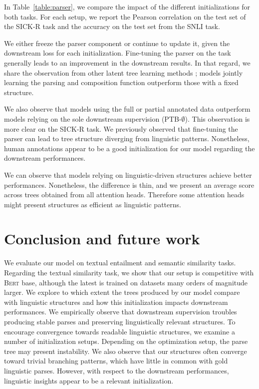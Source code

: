 In Table~\ref{table:parser}, we compare the impact of the different initializations for both tasks. For each setup, we report the Pearson correlation on the test set of the SICK-R task and the accuracy on the test set from the SNLI task.

We either freeze the parser component or continue to update it, given the downstream loss for each initialization. Fine-tuning the parser on the task generally leads to an improvement in the downstream results. In that regard, we share the observation from other latent tree learning methods \parencite{maillard_19, choi_18}; models jointly learning the parsing and composition function outperform those with a fixed structure. 

We also observe that models using the full or partial annotated data outperform models relying on the sole downstream supervision (PTB-$\emptyset$). This observation is more clear on the SICK-R task. We previously observed that fine-tuning the parser can lead to tree structure diverging from linguistic patterns. Nonetheless, human annotations appear to be a good initialization for our model regarding the downstream performances. 

We can observe that models relying on linguistic-driven structures achieve better performances. Nonetheless, the difference is thin, and we present an average score across trees obtained from all attention heads. Therefore some attention heads might present structures as efficient as linguistic patterns.

\section{Conclusion and future work}

We evaluate our model on textual entailment and semantic similarity tasks. Regarding the textual similarity task, we show that our setup is competitive with \textsc{Bert} base, although the latest is trained on datasets many orders of magnitude larger. We explore to which extent the trees produced by our model compare with linguistic structures and how this initialization impacts downstream performances. We empirically observe that downstream supervision troubles producing stable parses and preserving linguistically relevant structures.  %
To encourage convergence towards readable linguistic structures, we examine a number of initialization setups. Depending on the optimization setup, the parse tree may present instability. We also observe that our structures often converge toward trivial branching patterns, which have little in common with gold linguistic parses. However, with respect to the downstream performances, linguistic insights appear to be a relevant initialization.